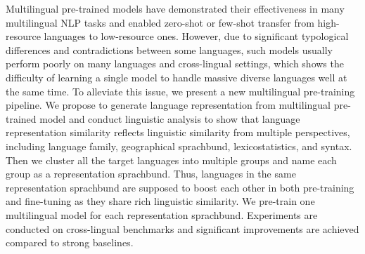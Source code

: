Multilingual pre-trained models have demonstrated their effectiveness in many multilingual NLP tasks and enabled zero-shot or few-shot transfer from high-resource languages to low-resource ones. However, due to significant typological differences and contradictions between some languages, such models usually perform poorly on many languages and cross-lingual settings, which shows the difficulty of learning a  single model to handle massive diverse languages well at the same time. To alleviate this issue, we present a new multilingual pre-training pipeline. We propose to generate language representation from multilingual pre-trained model and conduct linguistic analysis to show that language representation similarity reflects linguistic similarity from multiple perspectives, including language family, geographical sprachbund, lexicostatistics, and syntax. Then we cluster all the target languages into multiple groups and name each group as a representation sprachbund. Thus, languages in the same representation sprachbund are supposed to boost each other in both pre-training and fine-tuning as they share rich linguistic similarity. We pre-train one multilingual model for each representation sprachbund. Experiments are conducted on cross-lingual benchmarks and significant improvements are achieved compared to strong baselines.
